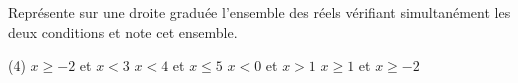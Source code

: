 %
%
    Représente sur une droite graduée l'ensemble des réels vérifiant simultanément les deux conditions et note cet ensemble.
    \begin{tasks}(4)
        \task $x \ge -2$ et $x<3$
        \task $x < 4 $ et $x\le 5$
        \task $x < 0$ et $x >1$
        \task $x \ge 1$ et $x \ge -2$
    \end{tasks}
